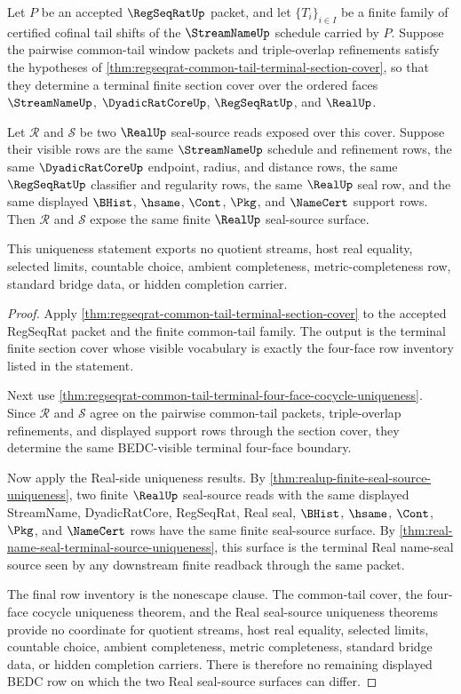 \begin{theorem}
\label{thm:regseqrat-common-tail-terminal-section-real-seal-source-uniqueness}
Let $P$ be an accepted $\RegSeqRatUp$ packet, and let $\{T_i\}_{i \in I}$ be a finite family of certified cofinal tail shifts of the $\StreamNameUp$ schedule carried by $P$. Suppose the pairwise common-tail window packets and triple-overlap refinements satisfy the hypotheses of \autoref{thm:regseqrat-common-tail-terminal-section-cover}, so that they determine a terminal finite section cover over the ordered faces $\StreamNameUp$, $\DyadicRatCoreUp$, $\RegSeqRatUp$, and $\RealUp$.

Let $\mathcal R$ and $\mathcal S$ be two $\RealUp$ seal-source reads exposed over this cover. Suppose their visible rows are the same $\StreamNameUp$ schedule and refinement rows, the same $\DyadicRatCoreUp$ endpoint, radius, and distance rows, the same $\RegSeqRatUp$ classifier and regularity rows, the same $\RealUp$ seal row, and the same displayed $\BHist$, $\hsame$, $\Cont$, $\Pkg$, and $\NameCert$ support rows. Then $\mathcal R$ and $\mathcal S$ expose the same finite $\RealUp$ seal-source surface.

This uniqueness statement exports no quotient streams, host real equality, selected limits, countable choice, ambient completeness, metric-completeness row, standard bridge data, or hidden completion carrier.
\end{theorem}
\begin{proof}
Apply \autoref{thm:regseqrat-common-tail-terminal-section-cover} to the accepted RegSeqRat packet and the finite common-tail family. The output is the terminal finite section cover whose visible vocabulary is exactly the four-face row inventory listed in the statement.

Next use \autoref{thm:regseqrat-common-tail-terminal-four-face-cocycle-uniqueness}. Since $\mathcal R$ and $\mathcal S$ agree on the pairwise common-tail packets, triple-overlap refinements, and displayed support rows through the section cover, they determine the same BEDC-visible terminal four-face boundary.

Now apply the Real-side uniqueness results. By \autoref{thm:realup-finite-seal-source-uniqueness}, two finite $\RealUp$ seal-source reads with the same displayed StreamName, DyadicRatCore, RegSeqRat, Real seal, $\BHist$, $\hsame$, $\Cont$, $\Pkg$, and $\NameCert$ rows have the same finite seal-source surface. By \autoref{thm:real-name-seal-terminal-source-uniqueness}, this surface is the terminal Real name-seal source seen by any downstream finite readback through the same packet.

The final row inventory is the nonescape clause. The common-tail cover, the four-face cocycle uniqueness theorem, and the Real seal-source uniqueness theorems provide no coordinate for quotient streams, host real equality, selected limits, countable choice, ambient completeness, metric completeness, standard bridge data, or hidden completion carriers. There is therefore no remaining displayed BEDC row on which the two Real seal-source surfaces can differ.
\end{proof}

